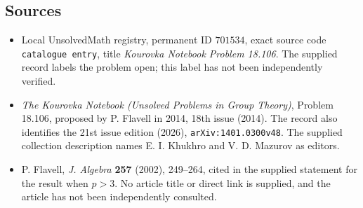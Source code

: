 \documentclass[11pt]{article}
\begin{document}
\subsection{Sources}
\begin{itemize}
\item Local UnsolvedMath registry, permanent ID \(701534\), exact source code \texttt{catalogue entry}, title \emph{Kourovka Notebook Problem 18.106}. The supplied record labels the problem open; this label has not been independently verified.
\item \emph{The Kourovka Notebook (Unsolved Problems in Group Theory)}, Problem 18.106, proposed by P. Flavell in 2014, 18th issue (2014). The record also identifies the 21st issue edition (2026), \texttt{arXiv:1401.0300v48}. The supplied collection description names E. I. Khukhro and V. D. Mazurov as editors.
\item P. Flavell, \emph{J. Algebra} \textbf{257} (2002), 249--264, cited in the supplied statement for the result when \(p>3\). No article title or direct link is supplied, and the article has not been independently consulted.
\end{itemize}
\end{document}
